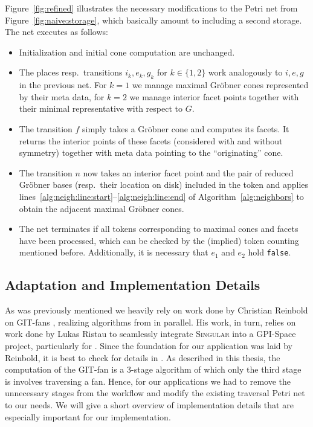 \documentclass[
  paper=a4,
  titlepage,
  bibliography=totoc,
  pagesize=pdftex
]{scrartcl}
\numberwithin{figure}{section}
\numberwithin{equation}{section}
\numberwithin{table}{section}
\theoremstyle{definition}
\numberwithin{definition}{section}
\begin{document}
Figure~\ref{fig:refined} illustrates the necessary modifications to the Petri net from
Figure~\ref{fig:naive:storage}, which basically amount to including a second storage. The
net executes as follows:
\begin{itemize}
  \item Initialization and initial cone computation are unchanged.
  \item The places resp.\ transitions $i_k, e_k, g_k$ for $k \in \{1, 2\}$ work
    analogously to $i,e,g$ in the previous net. For $k=1$ we manage maximal Gröbner cones
    represented by their meta data, for $k=2$ we manage interior facet points together
    with their minimal representative with respect to $G$.
  \item The transition $f$ simply takes a Gröbner cone and computes its facets. It returns
    the interior points of these facets (considered with and without symmetry) together
    with meta data pointing to the \enquote{originating} cone.
  \item The transition $n$ now takes an interior facet point and the pair of reduced
    Gröbner bases (resp.\ their location on disk) included in the token and applies
    lines~\ref{alg:neigh:line:start}--\ref{alg:neigh:line:end} of
    Algorithm~\ref{alg:neighbors} to obtain the adjacent maximal Gröbner cones.
  \item The net terminates if all tokens corresponding to maximal cones and facets have
    been processed, which can be checked by the (implied) token counting mentioned before.
    Additionally, it is necessary that $e_1$ and $e_2$ hold \texttt{false}.
\end{itemize}

\subsection{Adaptation and Implementation Details}

As was previously mentioned we heavily rely on work done by Christian Reinbold on GIT-fans
\cite{reinboldGitFan}, realizing algorithms from \cite{compGitFan} in parallel. His work,
in turn, relies on work done by Lukas Ristau to seamlessly integrate \textsc{Singular}
into a GPI-Space project, particularly for \cite{towardsParallel}. Since the foundation
for our application was laid by Reinbold, it is best to check for details in
\cite[Section~4]{reinboldGitFan}. As described in this thesis, the computation of the
GIT-fan is a 3-stage algorithm of which only the third stage is involves traversing a fan.
Hence, for our applications we had to remove the unnecessary stages from the workflow and
modify the existing traversal Petri net to our needs. We will give a short overview of
implementation details that are especially important for our implementation.
\end{document}

